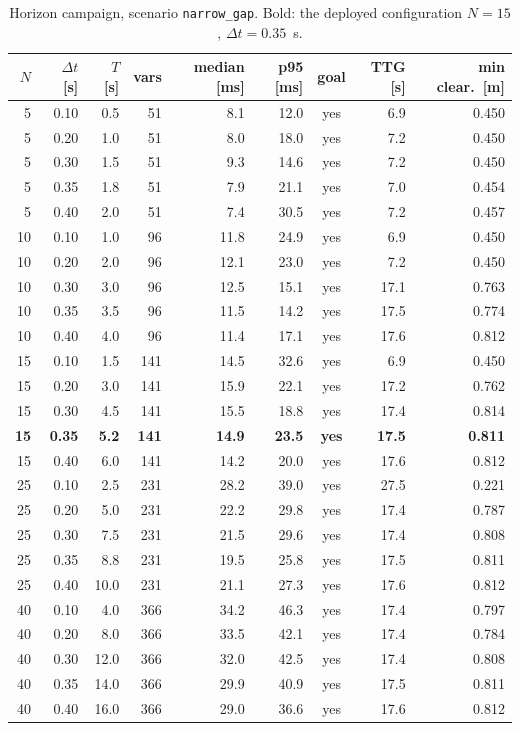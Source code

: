 \begin{table}[htbp]
  \centering
  \small
  \caption{Horizon campaign, scenario \texttt{narrow\_gap}. Bold: the deployed configuration $N=15$, $\Delta t=0.35$~s.}
  \label{res:tab:horizon:narrowgap}
  \begin{tabular}{rrrrrrcrr}
    \toprule
    $N$ & $\Delta t$ [s] & $T$ [s] & vars & median [ms] & p95 [ms] & goal & TTG [s] & min clear.\ [m] \\
    \midrule
    5 & 0.10 & 0.5 & 51 & 8.1 & 12.0 & yes & 6.9 & 0.450 \\
    5 & 0.20 & 1.0 & 51 & 8.0 & 18.0 & yes & 7.2 & 0.450 \\
    5 & 0.30 & 1.5 & 51 & 9.3 & 14.6 & yes & 7.2 & 0.450 \\
    5 & 0.35 & 1.8 & 51 & 7.9 & 21.1 & yes & 7.0 & 0.454 \\
    5 & 0.40 & 2.0 & 51 & 7.4 & 30.5 & yes & 7.2 & 0.457 \\
    10 & 0.10 & 1.0 & 96 & 11.8 & 24.9 & yes & 6.9 & 0.450 \\
    10 & 0.20 & 2.0 & 96 & 12.1 & 23.0 & yes & 7.2 & 0.450 \\
    10 & 0.30 & 3.0 & 96 & 12.5 & 15.1 & yes & 17.1 & 0.763 \\
    10 & 0.35 & 3.5 & 96 & 11.5 & 14.2 & yes & 17.5 & 0.774 \\
    10 & 0.40 & 4.0 & 96 & 11.4 & 17.1 & yes & 17.6 & 0.812 \\
    15 & 0.10 & 1.5 & 141 & 14.5 & 32.6 & yes & 6.9 & 0.450 \\
    15 & 0.20 & 3.0 & 141 & 15.9 & 22.1 & yes & 17.2 & 0.762 \\
    15 & 0.30 & 4.5 & 141 & 15.5 & 18.8 & yes & 17.4 & 0.814 \\
    \textbf{15} & \textbf{0.35} & \textbf{5.2} & \textbf{141} & \textbf{14.9} & \textbf{23.5} & \textbf{yes} & \textbf{17.5} & \textbf{0.811} \\
    15 & 0.40 & 6.0 & 141 & 14.2 & 20.0 & yes & 17.6 & 0.812 \\
    25 & 0.10 & 2.5 & 231 & 28.2 & 39.0 & yes & 27.5 & 0.221 \\
    25 & 0.20 & 5.0 & 231 & 22.2 & 29.8 & yes & 17.4 & 0.787 \\
    25 & 0.30 & 7.5 & 231 & 21.5 & 29.6 & yes & 17.4 & 0.808 \\
    25 & 0.35 & 8.8 & 231 & 19.5 & 25.8 & yes & 17.5 & 0.811 \\
    25 & 0.40 & 10.0 & 231 & 21.1 & 27.3 & yes & 17.6 & 0.812 \\
    40 & 0.10 & 4.0 & 366 & 34.2 & 46.3 & yes & 17.4 & 0.797 \\
    40 & 0.20 & 8.0 & 366 & 33.5 & 42.1 & yes & 17.4 & 0.784 \\
    40 & 0.30 & 12.0 & 366 & 32.0 & 42.5 & yes & 17.4 & 0.808 \\
    40 & 0.35 & 14.0 & 366 & 29.9 & 40.9 & yes & 17.5 & 0.811 \\
    40 & 0.40 & 16.0 & 366 & 29.0 & 36.6 & yes & 17.6 & 0.812 \\
    \bottomrule
  \end{tabular}
\end{table}

